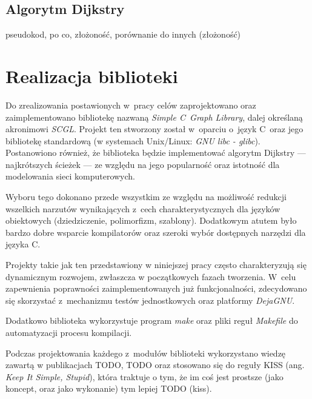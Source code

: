 \documentclass[a4paper,12pt,polish,oneside]{thesis}
\begin{document}
\section{Algorytm Dijkstry}
pseudokod, po co, złożoność, porównanie do innych (złożoność)




\chapter{Realizacja biblioteki}
Do zrealizowania postawionych w~pracy celów zaprojektowano oraz zaimplementowano bibliotekę nazwaną \emph{Simple C~Graph Library}, dalej określaną akronimowi \emph{SCGL}.
Projekt ten stworzony został w~oparciu o~język C~oraz jego bibliotekę standardową (w systemach Unix/Linux: \emph{GNU libc - glibc}).
Postanowiono również, że biblioteka będzie implementować algorytm Dijkstry --- najkrótszych ścieżek --- ze względu na jego popularność oraz istotność dla modelowania sieci komputerowych.

Wyboru tego dokonano przede wszystkim ze względu na możliwość redukcji wszelkich narzutów wynikających z~cech charakterystycznych dla języków obiektowych (dziedziczenie, polimorfizm, szablony).
Dodatkowym atutem było bardzo dobre wsparcie kompilatorów oraz szeroki wybór dostępnych narzędzi dla języka C.

Projekty takie jak ten przedstawiony w niniejszej pracy często charakteryzują się dynamicznym rozwojem, zwłaszcza w początkowych fazach tworzenia.
W~celu zapewnienia poprawności zaimplementowanych już funkcjonalności, zdecydowano się skorzystać z~mechanizmu testów jednostkowych oraz platformy \emph{DejaGNU}.

Dodatkowo biblioteka wykorzystuje program \emph{make} oraz pliki reguł \emph{Makefile} do automatyzacji procesu kompilacji.

Podczas projektowania każdego z~modułów biblioteki wykorzystano wiedzę zawartą w publikacjach TODO, TODO oraz stosowano się do reguły KISS (ang. \emph{Keep It Simple, Stupid}), która traktuje o tym, że im coś jest prostsze (jako koncept, oraz jako wykonanie) tym lepiej TODO (kiss).
\label{kiss}
\end{document}
